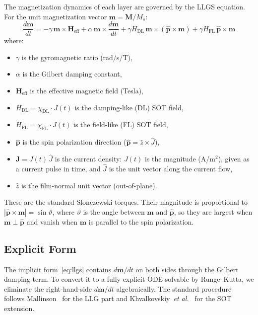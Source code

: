 \documentclass[11pt,a4paper]{article}
\newcommand{\mb}[1]{\mathbf{#1}}
\newcommand{\phat}{\hat{\mb{p}}}
\newcommand{\zhat}{\hat{z}}
\newcommand{\Heff}{\mb{H}_{\text{eff}}}
\newcommand{\Ms}{M_s}
\begin{document}
The magnetization dynamics of each layer are governed by the LLGS
equation. For the unit magnetization vector
$\mb{m} = \mb{M}/\Ms$:
%
\begin{equation}\label{eq:llgs}
\frac{d\mb{m}}{dt} =
    -\gamma \, \mb{m} \times \Heff
    + \alpha \, \mb{m} \times \frac{d\mb{m}}{dt}
    + \gamma H_{\text{DL}}\,
        \mb{m} \times (\phat \times \mb{m})
    + \gamma H_{\text{FL}}\,
        \phat \times \mb{m}
\end{equation}
%
where:
\begin{itemize}[nosep]
\item $\gamma$ is the gyromagnetic ratio (rad/s/T),
\item $\alpha$ is the Gilbert damping constant,
\item $\Heff$ is the effective magnetic field (Tesla),
\item $H_{\text{DL}} = \chi_{\text{DL}} \cdot J(t)$ is the
    damping-like (DL) SOT field,
\item $H_{\text{FL}} = \chi_{\text{FL}} \cdot J(t)$ is the
    field-like (FL) SOT field,
\item $\phat$ is the spin polarization direction
    ($\phat = \zhat \times \hat{J}$),
\item $\mb{J} = J(t)\,\hat{J}$ is the current density: $J(t)$ is
    the magnitude (A/m$^2$), given as a current pulse in time, and
    $\hat{J}$ is the unit vector along the current flow,
\item $\zhat$ is the film-normal unit vector (out-of-plane).
\end{itemize}
%
These are the standard Slonczewski torques.  Their magnitude is
proportional to $|\phat\times\mb{m}| = \sin\vartheta$, where
$\vartheta$ is the angle between $\mb{m}$ and $\phat$, so they are
largest when $\mb{m} \perp \phat$ and vanish when $\mb{m}$ is
parallel to the spin polarization.

\subsection{Explicit Form}
\label{sec:llgs_explicit_derivation}

The implicit form~\eqref{eq:llgs} contains $d\mb{m}/dt$ on both sides
through the Gilbert damping term. To convert it to a fully explicit
ODE solvable by Runge--Kutta, we eliminate the right-hand-side
$d\mb{m}/dt$ algebraically. The standard procedure
follows Mallinson~\cite{mallinson1987} for the LLG part and
Khvalkovskiy~\emph{et al.}~\cite{khvalkovskiy2013} for the SOT
extension.
\end{document}
